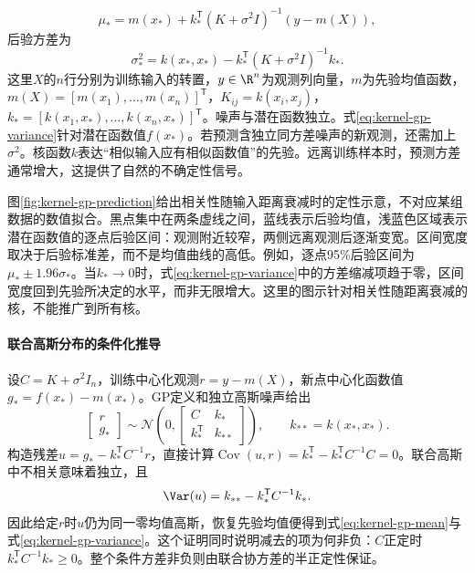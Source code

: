 \begin{equation}
 \mu_* = m(x_*)+k_*^{\mathsf T}(K+\sigma^2I)^{-1}(y-m(X)),\label{eq:kernel-gp-mean}
\end{equation}
后验方差为
\begin{equation}
 \sigma_*^2=k(x_*,x_*)-k_*^{\mathsf T}(K+\sigma^2I)^{-1}k_*.\label{eq:kernel-gp-variance}
\end{equation}
这里$X$的$n$行分别为训练输入的转置，$y\in\R^n$为观测列向量，$m$为先验均值函数，$m(X)=[m(x_1),\ldots,m(x_n)]^{\mathsf T}$，$K_{ij}=k(x_i,x_j)$，$k_*=[k(x_1,x_*),\ldots,k(x_n,x_*)]^{\mathsf T}$。噪声与潜在函数独立。式\eqref{eq:kernel-gp-variance}针对潜在函数值$f(x_*)$。若预测含独立同方差噪声的新观测，还需加上$\sigma^2$。核函数$k$表达“相似输入应有相似函数值”的先验。远离训练样本时，预测方差通常增大，这提供了自然的不确定性信号。

图\ref{fig:kernel-gp-prediction}给出相关性随输入距离衰减时的定性示意，不对应某组数据的数值拟合。黑点集中在两条虚线之间，蓝线表示后验均值，浅蓝色区域表示潜在函数值的逐点后验区间：观测附近较窄，两侧远离观测后逐渐变宽。区间宽度取决于后验标准差，而不是均值曲线的高低。例如，逐点95\%后验区间为$\mu_*\pm1.96\sigma_*$。当$k_*\to0$时，式\eqref{eq:kernel-gp-variance}中的方差缩减项趋于零，区间宽度回到先验所决定的水平，而非无限增大。这里的图示针对相关性随距离衰减的核，不能推广到所有核。
\paragraph{联合高斯分布的条件化推导}
设$C=K+\sigma^2I_n$，训练中心化观测$r=y-m(X)$，新点中心化函数值$g_*=f(x_*)-m(x_*)$。GP定义和独立高斯噪声给出
\begin{equation}
 \begin{bmatrix}r\\g_*\end{bmatrix}\sim\mathcal N\left(0,
 \begin{bmatrix}C&k_*\\k_*^{\mathsf T}&k_{**}\end{bmatrix}\right),
 \qquad k_{**}=k(x_*,x_*).
\end{equation}
构造残差$u=g_*-k_*^{\mathsf T}C^{-1}r$，直接计算$\operatorname{Cov}(u,r)=k_*^{\mathsf T}-k_*^{\mathsf T}C^{-1}C=0$。联合高斯中不相关意味着独立，且
\begin{equation}
 \Var(u)=k_{**}-k_*^{\mathsf T}C^{-1}k_*.
\end{equation}
因此给定$r$时$u$仍为同一零均值高斯，恢复先验均值便得到式\eqref{eq:kernel-gp-mean}与式\eqref{eq:kernel-gp-variance}。这个证明同时说明减去的项为何非负：$C$正定时$k_*^{\mathsf T}C^{-1}k_*\geq0$。整个条件方差非负则由联合协方差的半正定性保证。

